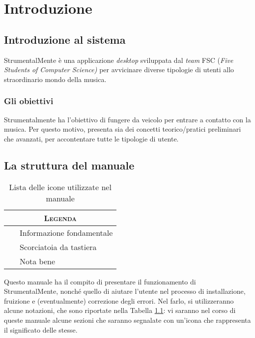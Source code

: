 \chapter{Introduzione}

\section{Introduzione al sistema}

StrumentalMente è una applicazione \emph{desktop} sviluppata dal
\emph{team} FSC (\emph{Five Students of Computer Science)} per
avvicinare diverse tipologie di utenti allo straordinario mondo della
musica.

\subsection{Gli obiettivi}

Strumentalmente ha l'obiettivo di fungere da veicolo per entrare a
contatto con la musica. Per questo motivo, presenta sia dei concetti
teorico/pratici preliminari che avanzati, per accontentare tutte le
tipologie di utente.

\section{La struttura del manuale}

\begin{table}[H]
	\centering
	\begin{tabular}{@{}l@{}}
		\toprule
		\multicolumn{1}{c}{\textsc{\textbf{Legenda}}}\\
		\midrule
		{\Large\faInfoCircle{}}~~~Informazione fondamentale\\
		\midrule
		{\Large\faKeyboardO{}}~~~Scorciatoia da tastiera\\
		\midrule
		{\Large\faWarning{}}~~~Nota bene\\
		\bottomrule
	\end{tabular}
	\caption{Lista delle icone utilizzate nel manuale}
	\label{tab:icons}
\end{table}

Questo manuale ha il compito di presentare il funzionamento di
StrumentalMente, nonché quello di aiutare l'utente nel processo di
installazione, fruizione e (eventualmente) correzione degli errori. Nel
farlo, si utilizzeranno alcune notazioni, che sono riportate nella
Tabella \ref{tab:icons}: vi saranno nel corso di queste manuale alcune sezioni che saranno segnalate con un'icona che rappresenta il significato delle stesse. 

